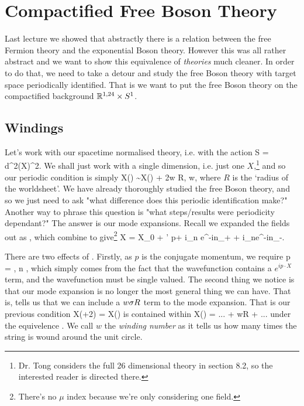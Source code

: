 \chapter{Compactified Free Boson Theory}

Last lecture we showed that abstractly there is a relation between the free Fermion theory and the exponential Boson theory. However this was all rather abstract and we want to show this equivalence of \textit{theories} much cleaner. In order to do that, we need to take a detour and study the free Boson theory with target space periodically identified. That is we want to put the free Boson theory on the compactified background $\mathbb{R}^{1,24}\times S^1$.

\section{Windings}

Let's work with our spacetime normalised theory, i.e. with the action
\bse 
    S =  \int d^2\sig (\p X)^2.
\ese
We shall just work with a single dimension, i.e. just one $X$,\footnote{Dr. Tong considers the full 26 dimensional theory in section 8.2, so the interested reader is directed there.} and so our periodic condition is simply 
\be  
\label{eqn:periodicX}
    X(\sig) \sim X(\sig) + 2\pi w R, \qquad w\in\Z,
\ee 
where $R$ is the `radius of the worldsheet'. We have already thoroughly studied the free Boson theory, and so we just need to ask "what difference does this periodic identification make?" Another way to phrase this question is "what steps/results were periodicity dependant?" The answer is our mode expansions. Recall we expanded the fields out as , which combine to give\footnote{There's no $\mu$ index because we're only considering one field.}
\bse 
    X = X_0 + \a' p\tau + i\sum_{n} e^{-in\sig_+} + i\sum_{n}e^{-in\sig_-}.
\ese 

There are two effects of . Firstly, as $p$ is the conjugate momentum, we require 
\bse 
    p = , \qquad n \in \Z,
\ese 
which simply comes from the fact that the wavefunction contains a $e^{ip\cdot X}$ term, and the wavefunction must be single valued. The second thing we notice is that our mode expansion is no longer the most general thing we can have. That is,  tells us that we can include a $w\sigma R$ term to the mode expansion. That is our previous condition 
\bse 
    X(\sig+2\pi) = X(\sig)
\ese 
is contained within 
\bse 
    X(\sig) = ... + w\sig R + ...
\ese 
under the equivelence . We call $w$ the \textit{winding number} as it tells us how many times the string is wound around the unit circle. 

